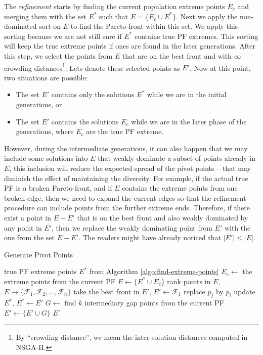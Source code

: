 \documentclass[journal]{IEEEtran}
\let\MYoriglatexcaption\caption
\renewcommand{\caption}[2][\relax]{\MYoriglatexcaption[#2]{#2}}
\begin{document}
The \textit{refinement} starts by finding the current population extreme points \(E_c\) and merging them with the set \(E^\ast\) such that \(E = \{E_c \cup E^\ast\}\). Next we apply the non-dominated sort on \(E\) to find the Pareto-front within this set. We apply this sorting because we are not still sure if \(E^\ast\) contains true PF extremes. This sorting will keep the true extreme points if ones are found in the later generations. After this step, we select the points from \(E\) that are on the best front and with \(\infty\) crowding distances\footnote{By ``crowding distance'', we mean the inter-solution distances computed in NSGA-II.}. Lets denote these selected points as \(E'\). Now at this point, two situations are possible:
%
\begin{itemize}
	\item The set \(E'\) contains only the solutions \(E^\ast\) while we are in the initial generations, or
	\item The set \(E'\) contains the solutions \(E_c\) while we are in the later phase of the generations, where \(E_c\) are the true PF extreme. 
\end{itemize}
%
However, during the intermediate generations, it can also happen that we may include some solutions into \(E\) that weakly dominate a subset of points already in \(E\), this inclusion will reduce the expected spread of the pivot points -- that may diminish the effect of maintaining the diversity. For example, if the actual true PF is a broken Pareto-front, and if \(E\) contains the extreme points from one broken edge, then we need to expand the current edges so that the refinement procedure can include points from the further extreme ends. Therefore, if there exist a point in \(E - E'\) that is on the best front and also weakly dominated by any point in \(E'\), then we replace the weakly dominating point from \(E'\) with the one from the set \(E - E'\). The readers might have already noticed that \(|E'| \le |E|\).
%
\begin{algorithm}[bp]
\caption{Generate Pivot Points}
\label{algo:generate-pivot-points}
\begin{algorithmic}[1]
	\REQUIRE true PF extreme points $E^{\ast}$ from Algorithm \ref{algo:find-extreme-points}
	\STATE $E_c \leftarrow$ the extreme points from the current PF
	\STATE $E \leftarrow \{E^\ast \cup E_c\}$
	\STATE rank points in $E$, $E \rightarrow \{\mathcal{F}_1, \mathcal{F}_2, \ldots, \mathcal{F}_n\}$
	\STATE take the best front in $E'$, $E' \leftarrow \mathcal{F}_1$
			\STATE replace $p_j$ by $p_i$
		\ENDIF
	\ENDFOR
	\STATE update $E^\ast$, $E^\ast \leftarrow E'$
	\STATE $G \leftarrow$ find $k$ intermediary gap points from the current PF
	\STATE $E' \leftarrow \{E' \cup G\}$
	\RETURN $E'$
\end{algorithmic}
\end{algorithm}
%
\end{document}
